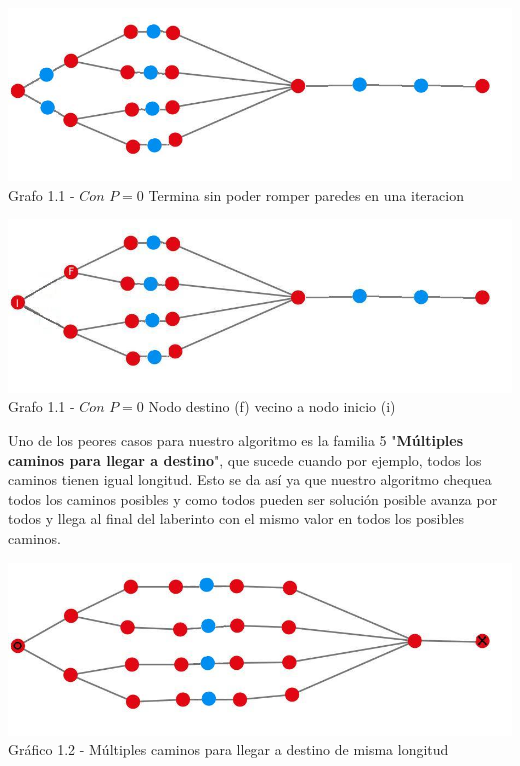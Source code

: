 \vspace*{0.3cm} \vspace*{0.3cm}
  \begin{center}
\includegraphics[scale=0.7]{./EJ1/ej1grafomejorcaso.jpeg}
{Grafo 1.1 - $Con$ $P=0$ Termina sin poder romper paredes en una iteracion}
  \end{center}
  \vspace*{0.3cm}

\vspace*{0.3cm} \vspace*{0.3cm}
  \begin{center}
\includegraphics[scale=0.7]{./EJ1/ej1grafomejorcaso2.jpeg}
{Grafo 1.1 - $Con$ $P=0$ Nodo destino (f) vecino a nodo inicio (i)}
  \end{center}
  \vspace*{0.3cm}

Uno de los peores casos para nuestro algoritmo es la familia 5 "\textbf{Múltiples caminos para llegar a destino}", que sucede cuando por ejemplo, todos los caminos tienen igual longitud. Esto se da as\'i ya que nuestro algoritmo chequea todos los caminos posibles y como todos pueden ser soluci\'on posible avanza por todos y llega al final del laberinto con el mismo valor en todos los posibles caminos.\\

\vspace*{0.3cm} \vspace*{0.3cm}
  \begin{center}
\includegraphics[scale=0.7]{./EJ1/ej1grafopeorcaso.jpeg}
{Gr\'afico 1.2 - Múltiples caminos para llegar a destino de misma longitud}
  \end{center}
  \vspace*{0.3cm}

